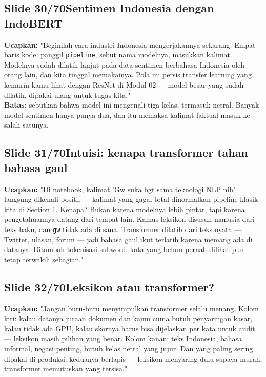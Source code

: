 \documentclass[11pt]{article}
\renewcommand{\framebox}[1]{\colorbox{acc!15}{\textcolor{acc}{\textbf{#1}}}}
\begin{document}
\subsection*{\framebox{Slide 30/70}\quad Sentimen Indonesia dengan IndoBERT}
\textbf{Ucapkan:} "Beginilah cara industri Indonesia mengerjakannya sekarang. Empat baris kode: panggil \texttt{pipeline}, sebut nama modelnya, masukkan kalimat. Modelnya sudah dilatih lanjut pada data sentimen berbahasa Indonesia oleh orang lain, dan kita tinggal memakainya. Pola ini persis transfer learning yang kemarin kamu lihat dengan ResNet di Modul 02 — model besar yang sudah dilatih, dipakai ulang untuk tugas kita."\\[2pt]
\textbf{Batas:} sebutkan bahwa model ini mengenali tiga kelas, termasuk netral. Banyak model sentimen hanya punya dua, dan itu memaksa kalimat faktual masuk ke salah satunya.\\[2pt]

\subsection*{\framebox{Slide 31/70}\quad Intuisi: kenapa transformer tahan bahasa gaul}
\textbf{Ucapkan:} "Di notebook, kalimat 'Gw suka bgt sama teknologi NLP nih' langsung dikenali positif — kalimat yang gagal total dinormalkan pipeline klasik kita di Section 1. Kenapa? Bukan karena modelnya lebih pintar, tapi karena pengetahuannya datang dari tempat lain. Kamus leksikon disusun manusia dari teks baku, dan \texttt{gw} tidak ada di sana. Transformer dilatih dari teks nyata — Twitter, ulasan, forum — jadi bahasa gaul ikut terlatih karena memang ada di datanya. Ditambah tokenisasi subword, kata yang belum pernah dilihat pun tetap terwakili sebagian."\\[2pt]

\subsection*{\framebox{Slide 32/70}\quad Leksikon atau transformer?}
\textbf{Ucapkan:} "Jangan buru-buru menyimpulkan transformer selalu menang. Kolom kiri: kalau datanya jutaan dokumen dan kamu cuma butuh penyaringan kasar, kalau tidak ada GPU, kalau skornya harus bisa dijelaskan per kata untuk audit — leksikon masih pilihan yang benar. Kolom kanan: teks Indonesia, bahasa informal, negasi penting, butuh kelas netral yang jujur. Dan yang paling sering dipakai di produksi: keduanya berlapis — leksikon menyaring dulu supaya murah, transformer memutuskan yang tersisa."\\[2pt]
\end{document}
